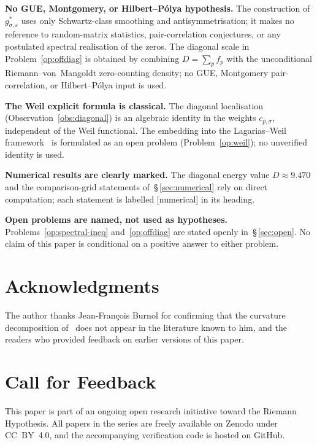 \documentclass[11pt]{article}
\begin{document}
\textbf{No GUE, Montgomery, or Hilbert--P\'olya hypothesis.}
The construction of $g^*_{\sigma,\varepsilon}$ uses only
Schwartz-class smoothing and antisymmetrisation; it makes no
reference to random-matrix statistics, pair-correlation
conjectures, or any postulated spectral realisation of the
zeros.
The diagonal scale in Problem~\ref{op:offdiag} is obtained by
combining $D=\sum_p f_p$ with the unconditional
Riemann--von~Mangoldt zero-counting density; no GUE,
Montgomery pair-correlation, or Hilbert--P\'olya input is used.

\textbf{The Weil explicit formula is classical.}
The diagonal localisation (Observation~\ref{obs:diagonal})
is an algebraic identity in the weights $c_{p,\sigma}$,
independent of the Weil functional.
The embedding into the Lagarias--Weil
framework~\cite{Lagarias} is formulated as an open problem
(Problem~\ref{op:weil}); no unverified identity is used.

\textbf{Numerical results are clearly marked.}
The diagonal energy value $D\approx 9.470$ and the
comparison-grid statements of~\S\,\ref{sec:numerical} rely on
direct computation; each statement is labelled [numerical] in
its heading.

\textbf{Open problems are named, not used as hypotheses.}
Problems~\ref{op:spectral-ineq} and~\ref{op:offdiag} are stated
openly in~\S\,\ref{sec:open}.
No claim of this paper is conditional on a positive answer to
either problem.

\section*{Acknowledgments}

The author thanks Jean-Fran\c{c}ois Burnol for confirming that
the curvature decomposition of~\cite{Paper1} does not appear in
the literature known to him, and the readers who provided
feedback on earlier versions of this paper.

\section*{Call for Feedback}

This paper is part of an ongoing open research initiative
toward the Riemann Hypothesis.
All papers in the series are freely available on Zenodo under
CC~BY~4.0, and the accompanying verification code is hosted on
GitHub.
\end{document}
